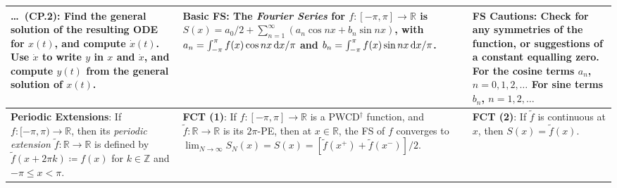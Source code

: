 \clearpage
%
%
\begin{tabular}{|m{.31\linewidth}|m{.31\linewidth}|m{.31\linewidth}|}
\hline
%
\textbf{\ldots\ (CP.2)}: Find the general solution of the resulting ODE for
$x(t)$, and compute $\dot{x}(t)$. Use $\dot{x}$ to write $y$ in $x$ and
$\dot{x}$, and compute $y(t)$ from the general solution of $x(t)$. &
%
\textbf{Basic FS}: The \emph{Fourier Series} for $f:[-\pi,\pi]\to \mathbb{R}$ is
$S(x)=a_0/2 + \sum_{n=1}^\infty (a_n\cos nx + b_n\sin nx)$, with
$a_n=\int_{-\pi}^\pi f(x)\cos nx\,\mathrm{d}x/\pi$ and $b_n=\int_{-\pi}^\pi
f(x)\sin nx\,\mathrm{d}x/\pi$. &
%
\textbf{FS Cautions}: Check for any symmetries of the function, or suggestions
of a constant equalling zero. For the cosine terms $a_n$, $n=0,1,2,\ldots$ For
sine terms $b_n$, $n=1,2,\ldots$ \\
%
\hline
%
\textbf{Periodic Extensions}: If $f:[-\pi,\pi)\to\mathbb{R}$, then its
\emph{periodic extension} $\tilde{f}:\mathbb{R}\to\mathbb{R}$ is defined by
$\tilde{f}(x+2\pi k)\coloneqq f(x)$ for $k\in\mathbb{Z}$ and $-\pi\leq x<\pi$. &
%
\textbf{FCT (1)}: If $f:[-\pi,\pi]\to\mathbb{R}$ is a PWCD${}^\dagger$ function,
and $\tilde{f}:\mathbb{R}\to\mathbb{R}$ is its $2\pi$-PE, then at
$x\in\mathbb{R}$, the FS of $f$ converges to
$\lim_{N\to\infty}S_N(x)=S(x)=[\tilde{f}(x^+)+\tilde{f}(x^-)]/2$. &
%
\textbf{FCT (2)}: If $\tilde{f}$ is continuous at $x$, then $S(x)=\tilde{f}(x)$.


\end{tabular}
